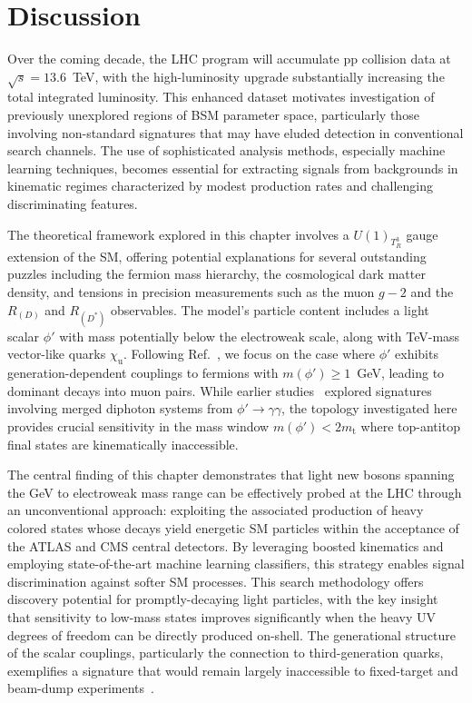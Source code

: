 \section{Discussion}\label{sec:discussion}

Over the coming decade, the LHC program will accumulate pp collision data at $\sqrt{s} = 13.6$~\textrm{TeV}, with the high-luminosity upgrade substantially increasing the total integrated luminosity. This enhanced dataset motivates investigation of previously unexplored regions of BSM parameter space, particularly those involving non-standard signatures that may have eluded detection in conventional search channels. The use of sophisticated analysis methods, especially machine learning techniques, becomes essential for extracting signals from backgrounds in kinematic regimes characterized by modest production rates and challenging discriminating features. 

The theoretical framework explored in this chapter involves a $U(1)_{T^3_R}$ gauge extension of the SM, offering potential explanations for several outstanding puzzles including the fermion mass hierarchy, the cosmological dark matter density, and tensions in precision measurements such as the muon $g - 2$ and the $R_{(D)}$ and $R_{(D^*)}$ observables. The model's particle content includes a light scalar $\phi'$ with mass potentially below the electroweak scale, along with TeV-mass vector-like quarks $\chi_\mathrm{u}$. Following Ref.~\cite{Dutta2020}, we focus on the case where $\phi'$ exhibits generation-dependent couplings to fermions with $m(\phi') \ge 1$~\textrm{GeV}, leading to dominant decays into muon pairs. While earlier studies~\cite{Dutta2023, Banerjee_2016} explored signatures involving merged diphoton systems from $\phi' \to \gamma\gamma$, the topology investigated here provides crucial sensitivity in the mass window $m(\phi') < 2 m_{\mathrm{t}}$ where top-antitop final states are kinematically inaccessible. 

The central finding of this chapter demonstrates that light new bosons spanning the GeV to electroweak mass range can be effectively probed at the LHC through an unconventional approach: exploiting the associated production of heavy colored states whose decays yield energetic SM particles within the acceptance of the ATLAS and CMS central detectors. By leveraging boosted kinematics and employing state-of-the-art machine learning classifiers, this strategy enables signal discrimination against softer SM processes. This search methodology offers discovery potential for promptly-decaying light particles, with the key insight that sensitivity to low-mass states improves significantly when the heavy UV degrees of freedom can be directly produced on-shell. The generational structure of the scalar couplings, particularly the connection to third-generation quarks, exemplifies a signature that would remain largely inaccessible to fixed-target and beam-dump experiments~\cite{Cacciapaglia_2023}.

